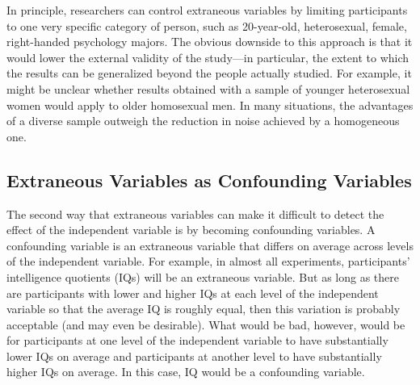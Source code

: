 In principle, researchers can control extraneous variables by limiting participants to one very specific category of person, such as 20-year-old, heterosexual, female, right-handed psychology majors. The obvious downside to this approach is that it would lower the external validity of the study---in particular, the extent to which the results can be generalized beyond the people actually studied. For example, it might be unclear whether results obtained with a sample of younger heterosexual women would apply to older homosexual men. In many situations, the advantages of a diverse sample outweigh the reduction in noise achieved by a homogeneous one.

\subsection{Extraneous Variables as Confounding Variables}

The second way that extraneous variables can make it difficult to detect the effect of the independent variable is by becoming confounding variables. A confounding variable is an extraneous variable that differs on average across levels of the independent variable. For example, in almost all experiments, participants' intelligence quotients (IQs) will be an extraneous variable. But as long as there are participants with lower and higher IQs at each level of the independent variable so that the average IQ is roughly equal, then this variation is probably acceptable (and may even be desirable). What would be bad, however, would be for participants at one level of the independent
variable to have substantially lower IQs on average and participants at another level to have substantially higher IQs on average. In this case, IQ would be a confounding variable.

